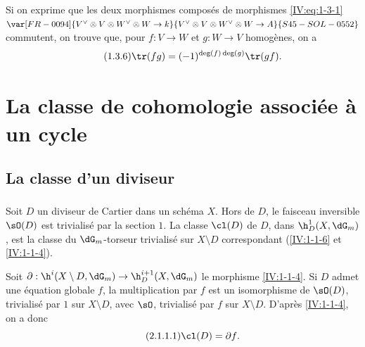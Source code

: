 Si on exprime que les deux morphismes composés de morphismes 
\eqref{IV:eq:1-3-1} $\var[FR-0094]{V^\vee\otimes V\otimes W^\vee\otimes W\to k}{V^\vee\otimes V\otimes W^\vee\otimes W\to A}{S45-SOL-0552}$ commutent, on 
trouve que, pour $f:V\to W$ et $g:W\to V$ homogènes, on a 
\begin{equation*}\tag{1.3.6}\label{IV:eq:1-3-6}
  \tr(f g) = (-1)^{\deg(f)\deg(g)} \tr(g f) \text{.}
\end{equation*}




















\section{La classe de cohomologie associée à un cycle}\label{IV:2}










\subsection{La classe d'un diviseur}\label{IV:2-1}





\subsubsection{}\label{IV:2-1-1}

Soit $D$ un diviseur de Cartier dans un schéma $X$. Hors de $D$, le faisceau 
inversible $\sO(D)$ est trivialisé par la section $1$. La classe 
$\cl(D)$ de $D$, dans $\h_D^1(X,\dG_m)$, est la classe du 
$\dG_m$-torseur trivialisé sur $X\setminus D$ correspondant 
(\ref{IV:1-1-6} et \ref{IV:1-1-4}). 

Soit $\partial:\h^i(X\setminus D,\dG_m)\to \h_D^{i+1}(X,\dG_m)$ le morphisme 
\ref{IV:1-1-4}. Si $D$ admet une équation globale $f$, la multiplication par 
$f$ est un isomorphisme de $\sO(D)$, trivialisé par $1$ sur $X\setminus D$, 
avec $\sO$, trivialisé par $f$ sur $X\setminus D$. D'après \ref{IV:1-1-4}, 
on a donc 
\begin{equation*}\tag{2.1.1.1}\label{IV:eq:2-1-1}
  \cl(D) = \partial f \text{.}
\end{equation*}

